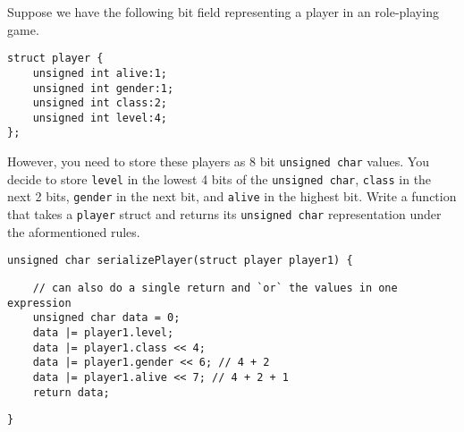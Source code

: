 Suppose we have the following bit field representing a player in an role-playing game.

\begin{verbatim}
struct player {
    unsigned int alive:1;
    unsigned int gender:1;
    unsigned int class:2;
    unsigned int level:4;
};
\end{verbatim}

However, you need to store these players as 8 bit \texttt{unsigned char} values. You decide to store \texttt{level} in the lowest 4 bits of the \texttt{unsigned char}, \texttt{class} in the next 2 bits, \texttt{gender} in the next bit, and \texttt{alive} in the highest bit. Write a function that takes a \texttt{player} struct and returns its \texttt{unsigned char} representation under the aformentioned rules.

\begin{verbatim}
unsigned char serializePlayer(struct player player1) {
\end{verbatim}
\begin{answer}
\begin{verbatim}
    // can also do a single return and `or` the values in one expression
    unsigned char data = 0;
    data |= player1.level;
    data |= player1.class << 4;
    data |= player1.gender << 6; // 4 + 2
    data |= player1.alive << 7; // 4 + 2 + 1
    return data;
\end{verbatim}
\end{answer}
\begin{verbatim}
}
\end{verbatim}
